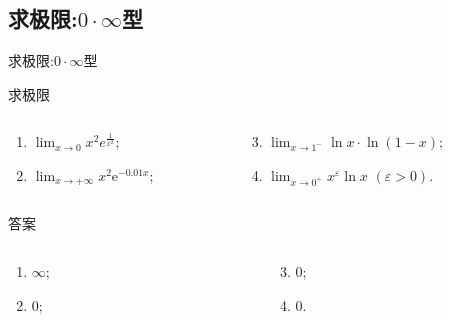 \documentclass[
10pt,
aspectratio=43,
]{beamer}
\begin{document}
\subsection{求极限:$\displaystyle0\cdot\infty$型}
\begin{frame}{求极限:$\displaystyle0\cdot\infty$型}
	\everymath{\displaystyle}
	\begin{block}{求极限}
		\begin{columns}[t]
			\begin{column}{0.5\textwidth}
				\begin{enumerate}
					\item $\lim_{x \rightarrow 0} x^2 e^{\frac{1}{x^2}}$;
					\item $\lim_{x \rightarrow +\infty} x^2 \mathrm{e}^{-0.01 x}$;
				\end{enumerate}
			\end{column}
			\begin{column}{0.5\textwidth}
				\begin{enumerate}
					\setcounter{enumi}{2}
					\item $\lim_{x \rightarrow 1^-} \ln x \cdot \ln (1-x)$;
					\item $\lim_{x \rightarrow 0^+} x^{\varepsilon} \ln x \,\,(\varepsilon>0)$.
				\end{enumerate}
			\end{column}
		\end{columns}
	\end{block}

	\begin{exampleblock}{答案}
		\begin{columns}[t]
			\begin{column}{0.5\textwidth}
				\begin{enumerate}
					\pause
					\item $\infty$;
					\item $0$;
				\end{enumerate}
			\end{column}
			\begin{column}{0.5\textwidth}
				\begin{enumerate}
					\setcounter{enumi}{2}
					\pause
					\item $0$;
					\item $0$.
				\end{enumerate}
			\end{column}
		\end{columns}
	\end{exampleblock}
\end{frame}
\end{document}
